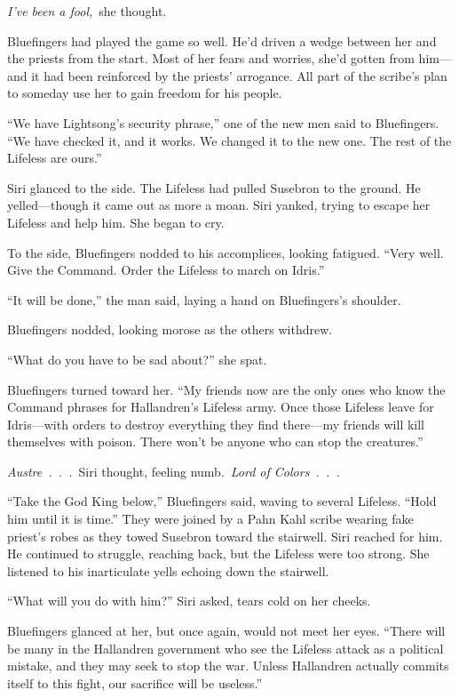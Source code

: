 \textit{I’ve been a fool,}~she thought.

Bluefingers had played the game so well. He’d driven a wedge between her and the priests from the start. Most of her fears and worries, she’d gotten from him—and it had been reinforced by the priests’ arrogance. All part of the scribe’s plan to someday use her to gain freedom for his people.

“We have Lightsong’s security phrase,” one of the new men said to Bluefingers. “We have checked it, and it works. We changed it to the new one. The rest of the Lifeless are ours.”

Siri glanced to the side. The Lifeless had pulled Susebron to the ground. He yelled—though it came out as more a moan. Siri yanked, trying to escape her Lifeless and help him. She began to cry.

To the side, Bluefingers nodded to his accomplices, looking fatigued. “Very well. Give the Command. Order the Lifeless to march on Idris.”

“It will be done,” the man said, laying a hand on Bluefingers’s shoulder.

Bluefingers nodded, looking morose as the others withdrew.

“What do you have to be sad about?” she spat.

Bluefingers turned toward her. “My friends now are the only ones who know the Command phrases for Hallandren’s Lifeless army. Once those Lifeless leave for Idris—with orders to destroy everything they find there—my friends will kill themselves with poison. There won’t be anyone who can stop the creatures.”

\textit{Austre~.~.~.}~Siri thought, feeling numb.~\textit{Lord of Colors~.~.~.}

“Take the God King below,” Bluefingers said, waving to several Lifeless. “Hold him until it is time.” They were joined by a Pahn Kahl scribe wearing fake priest’s robes as they towed Susebron toward the stairwell. Siri reached for him. He continued to struggle, reaching back, but the Lifeless were too strong. She listened to his inarticulate yells echoing down the stairwell.

“What will you do with him?” Siri asked, tears cold on her cheeks.

Bluefingers glanced at her, but once again, would not meet her eyes. “There will be many in the Hallandren government who see the Lifeless attack as a political mistake, and they may seek to stop the war. Unless Hallandren actually commits itself to this fight, our sacrifice will be useless.”

